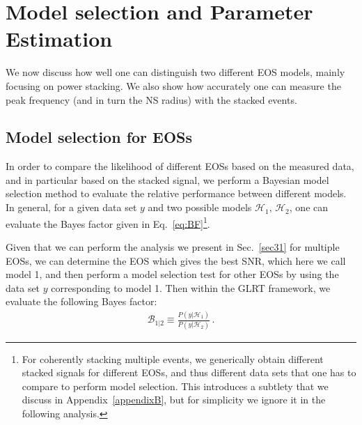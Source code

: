\documentclass[prd,aps,floatfix,superscriptaddress,nofootinbib,twocolumn,10pt,English]{revtex4-1}
\begin{document}
\section{Model selection and Parameter Estimation}\label{sec4}

We now discuss how well one can distinguish two different EOS models, mainly focusing on power stacking.
We also show how accurately one can measure the peak frequency (and in turn 
the NS radius) with the stacked events.

\subsection{Model  selection for EOSs}\label{sec4a}

In order to compare the likelihood of different EOSs based on the
measured data, and in particular based on the stacked signal, we
perform a Bayesian model selection method to evaluate the relative
performance between different models. In general, for a given data set 
$y$ and two possible models $\mathcal{H}_1, \,\mathcal{H}_2$,
one can evaluate the Bayes factor given in Eq.~\eqref{eq:BF}\footnote{For coherently stacking multiple events, we generically obtain different stacked
signals for different EOSs, and thus different data sets that one has to compare to
perform model selection. This introduces a subtlety that we discuss in
Appendix~\ref{appendixB}, but for simplicity we ignore it in the following analysis.}.

Given that we can perform the analysis we present in Sec.~\ref{sec31}
for multiple EOSs, we can determine the EOS which gives the best SNR, which
here we call model 1, and then perform a model selection test for
other EOSs by using the data set $y$ corresponding to
model 1. Then within the GLRT framework, we evaluate the following
Bayes factor:
\begin{align}\label{eqodd3}
\mathcal B_{1|2} \equiv \frac{P(y | \mathcal{H}_1)}{P(y | \mathcal{H}_2)}\,.
\end{align}
\end{document}
